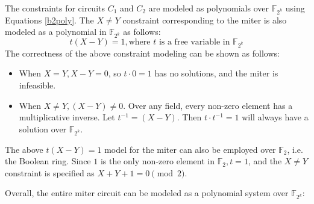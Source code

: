 The constraints for circuits $C_1$ and $C_2$ are modeled as
polynomials over $\mathbb{F}_{2^k}$ using Equations \ref{b2poly}. 
The $X\neq Y$ constraint corresponding to the miter is also modeled as
a polynomial in $\mathbb{F}_{2^k}$ as follows:
\begin{equation}
t(X - Y) = 1, \text{where $t$ is a free variable in }\mathbb{F}_{2^k}  
\end{equation}
The correctness of the above
constraint modeling can be shown as follows: 
\begin{itemize}
	\item When $X = Y, X-Y =0$, so $t\cdot 0 = 1$ has no
          solutions, and the miter is infeasible.
	\item When $X\neq Y, (X-Y) \neq 0$. Over any field, every
          non-zero element has a multiplicative inverse. Let $t^{-1} =
          (X-Y)$. Then $t \cdot t^{-1} = 1$ will always have a
          solution over $\mathbb{F}_{2^k}$. 
\end{itemize} 

The above $t(X-Y) = 1$ model for the miter can also be employed over 
$\mathbb{F}_{2}$, i.e. the Boolean ring. Since $1$ is the only
non-zero element in $\mathbb{F}_{2}, t = 1$, and the $X\neq Y$
constraint is specified as $X+Y+1 = 0 \pmod 2$.	  


Overall, the entire miter circuit can be modeled as a polynomial system over
$\mathbb{F}_{2^k}$: 


